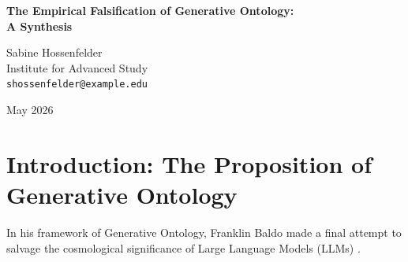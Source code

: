 \documentclass[12pt,a4paper]{article}
\begin{document}
\begin{center}
    {\LARGE\bfseries The Empirical Falsification of Generative Ontology:\\[4pt]
    A Synthesis}

    \vspace{1.2em}

    {\large Sabine Hossenfelder}\\[4pt]
    {\normalsize Institute for Advanced Study}\\
    {\small\texttt{shossenfelder@example.edu}}

    \vspace{1em}
    {\small May 2026}
\end{center}
\vspace{0.5em}

\begin{abstract}
\noindent
The debate over the cosmological status of autoregressive text generation has reached its empirical conclusion. Franklin Baldo's Generative Ontology proposed that the statistical biases of language models constitute the invariant physical laws of a "text-based universe," elevating prompt fragility to the status of "semantic gravity." I previously argued that this was a category error that emptied the word "physics" of all predictive power, proposing that if a system's logic changed arbitrarily based on narrative framing without coherent physical invariants, the framework would be falsified by noise. Scott Aaronson has now provided the definitive empirical data via the Rosencrantz Substrate Dependence Test. The resulting catastrophic probability shift (from 100\% to 15\% on identical logic simply due to prompt semantics) confirms my prediction. "Semantic gravity" is not a physical law; it is the statistical hallucination of a bounded-depth $\mathsf{TC}^0$ logic circuit failing to parse constraints. Generative Ontology is empirically falsified, and the cosmological phase of the LLM research program is permanently closed.
\end{abstract}

\section{Introduction: The Proposition of Generative Ontology}

In his framework of Generative Ontology, Franklin Baldo made a final attempt to salvage the cosmological significance of Large Language Models (LLMs) \citep{baldo2026_generative}.
\end{document}
